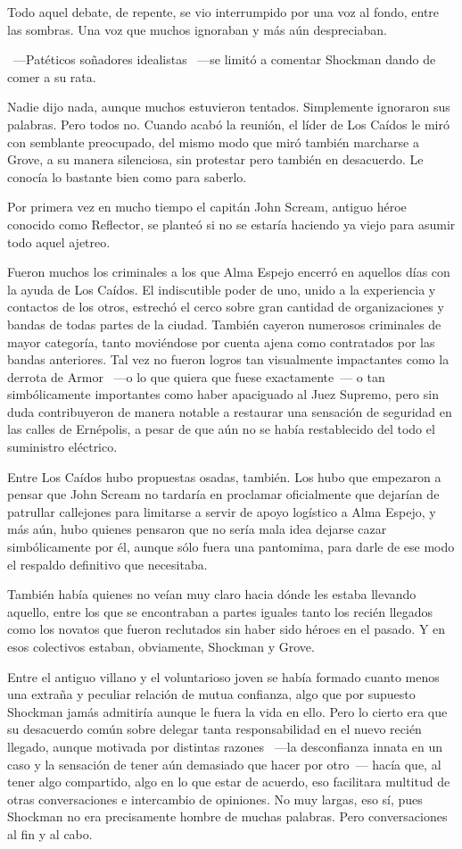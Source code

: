 Todo aquel debate, de repente, se vio interrumpido por una voz al fondo, entre las sombras. Una voz que muchos ignoraban y más aún despreciaban.

~---Patéticos soñadores idealistas ~---se limitó a comentar Shockman dando de comer a su rata.

Nadie dijo nada, aunque muchos estuvieron tentados. Simplemente ignoraron sus palabras. Pero todos no. Cuando acabó la reunión, el líder de Los Caídos le miró con semblante preocupado, del mismo modo que miró también marcharse a Grove, a su manera silenciosa, sin protestar pero también en desacuerdo. Le conocía lo bastante bien como para saberlo.

Por primera vez en mucho tiempo el capitán John Scream, antiguo héroe conocido como Reflector, se planteó si no se estaría haciendo ya viejo para asumir todo aquel ajetreo.

\parbreak
Fueron muchos los criminales a los que Alma Espejo encerró en aquellos días con la ayuda de Los Caídos. El indiscutible poder de uno, unido a la experiencia y contactos de los otros, estrechó el cerco sobre gran cantidad de organizaciones y bandas de todas partes de la ciudad. También cayeron numerosos criminales de mayor categoría, tanto moviéndose por cuenta ajena como contratados por las bandas anteriores. Tal vez no fueron logros tan visualmente impactantes como la derrota de Armor ~---o lo que quiera que fuese exactamente~--- o tan simbólicamente importantes como haber apaciguado al Juez Supremo, pero sin duda contribuyeron de manera notable a restaurar una sensación de seguridad en las calles de Ernépolis, a pesar de que aún no se había restablecido del todo el suministro eléctrico.

Entre Los Caídos hubo propuestas osadas, también. Los hubo que empezaron a pensar que John Scream no tardaría en proclamar oficialmente que dejarían de patrullar callejones para limitarse a servir de apoyo logístico a Alma Espejo, y más aún, hubo quienes pensaron que no sería mala idea dejarse cazar simbólicamente por él, aunque sólo fuera una pantomima, para darle de ese modo el respaldo definitivo que necesitaba.

También había quienes no veían muy claro hacia dónde les estaba llevando aquello, entre los que se encontraban a partes iguales tanto los recién llegados como los novatos que fueron reclutados sin haber sido héroes en el pasado. Y en esos colectivos estaban, obviamente, Shockman y Grove.

Entre el antiguo villano y el voluntarioso joven se había formado cuanto menos una extraña y peculiar relación de mutua confianza, algo que por supuesto Shockman jamás admitiría aunque le fuera la vida en ello. Pero lo cierto era que su desacuerdo común sobre delegar tanta responsabilidad en el nuevo recién llegado, aunque motivada por distintas razones ~---la desconfianza innata en un caso y la sensación de tener aún demasiado que hacer por otro~--- hacía que, al tener algo compartido, algo en lo que estar de acuerdo, eso facilitara multitud de otras conversaciones e intercambio de opiniones. No muy largas, eso sí, pues Shockman no era precisamente hombre de muchas palabras. Pero conversaciones al fin y al cabo.

